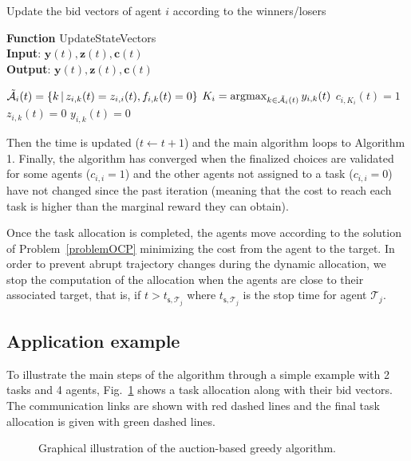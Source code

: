 \documentclass{ifacconf}
\newcommand{\sa}{{\mathsf{s}}}
\newcommand{\cA}{\mathcal{A}}
\newcommand{\cT}{\mathcal{T}}
\begin{document}
\begin{algorithm}[ht]
\caption{Update the bid vectors of agent $i$ according to the winners/losers}
\textbf{Function} UpdateStateVectors\\
\textbf{Input}: $\bm{y}(t), \bm{z}(t), \bm{c}(t)$ \\
\textbf{Output}: $\bm{y}(t), \bm{z}(t), \bm{c}(t)$
\begin{algorithmic}[1]
  \State $ \Tilde{\cA}_i(t) = \{ k\, | \, z_{i,k}(t) = z_{i,i}(t), f_{i,k}(t) = 0 \}$
  \State $K_i = \mathop{{\arg\!\max}}_{k \in \Tilde{\cA}_i(t)} y_{i,k}(t)$
  \State $c_{i,K_i}(t) = 1$
  \For{$k \in \Tilde{\cA}_i(t) \setminus K_i$}
    \State $z_{i,k}(t) = 0$
    \State $y_{i,k}(t) = 0$
  \EndFor
\EndFor
\end{algorithmic}
\end{algorithm}

Then the time is updated ($t \leftarrow t+1$) and the main algorithm loops to Algorithm 1.
Finally, the algorithm has converged when the finalized choices are validated for some agents ($c_{i,i} = 1$) and the other agents not assigned to a task ($c_{i,i} = 0$) have not changed since the past iteration (meaning that the cost to reach each task is higher than the marginal reward they can obtain).

Once the task allocation is completed, the agents move according to the solution of Problem~\ref{problemOCP} minimizing the cost from the agent to the target. In order to prevent abrupt trajectory changes during the dynamic allocation, we stop the computation of the allocation when the agents are close to their associated target, that is, if $t > t_{\sa,\cT_j}$ where $t_{\sa,\cT_j}$ is the stop time for agent $\cT_j$.

\subsection{Application example}

To illustrate the main steps of the algorithm through a simple example with 2 tasks and 4 agents, Fig.~\ref{fig:task_alloc_ink} shows a task allocation along with their bid vectors. The communication links are shown with red dashed lines and the final task allocation is given with green dashed lines. 

\begin{figure}[h]
\fontsize{5pt}{11pt}
\def\svgwidth{\linewidth}
\centering

\caption{Graphical illustration of the auction-based greedy algorithm.}
\label{fig:task_alloc_ink}
\end{figure}
\end{document}

